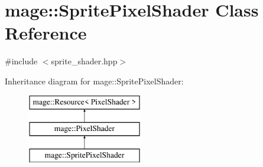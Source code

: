 \hypertarget{classmage_1_1_sprite_pixel_shader}{}\section{mage\+:\+:Sprite\+Pixel\+Shader Class Reference}
\label{classmage_1_1_sprite_pixel_shader}


{\ttfamily \#include $<$sprite\+\_\+shader.\+hpp$>$}

Inheritance diagram for mage\+:\+:Sprite\+Pixel\+Shader\+:\begin{figure}[H]
\begin{center}
\leavevmode
\includegraphics[height=3.000000cm]{classmage_1_1_sprite_pixel_shader}
\end{center}
\end{figure}
